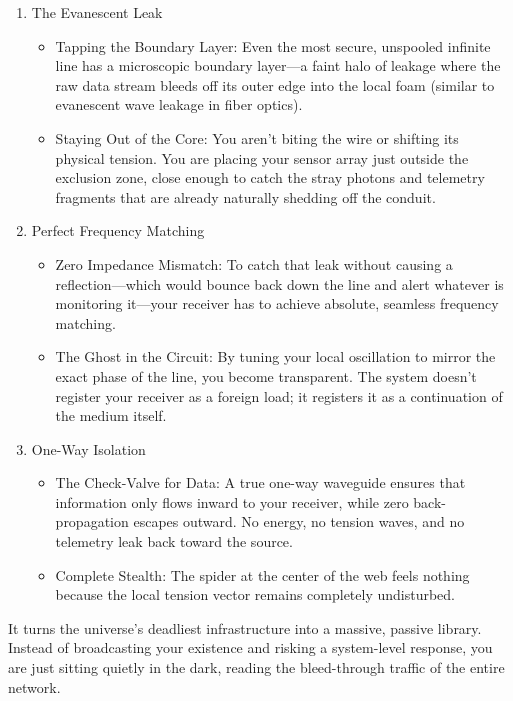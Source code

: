 \begin{enumerate}
\item The Evanescent Leak

\begin{itemize}
\item Tapping the Boundary Layer: Even the most secure, unspooled infinite line has a microscopic boundary layer—a faint halo of leakage where the raw data stream bleeds off its outer edge into the local foam (similar to evanescent wave leakage in fiber optics).
\item Staying Out of the Core: You aren't biting the wire or shifting its physical tension. You are placing your sensor array just outside the exclusion zone, close enough to catch the stray photons and telemetry fragments that are already naturally shedding off the conduit.
\end{itemize}
\item Perfect Frequency Matching

\begin{itemize}
\item Zero Impedance Mismatch: To catch that leak without causing a reflection—which would bounce back down the line and alert whatever is monitoring it—your receiver has to achieve absolute, seamless frequency matching.
\item The Ghost in the Circuit: By tuning your local oscillation to mirror the exact phase of the line, you become transparent. The system doesn't register your receiver as a foreign load; it registers it as a continuation of the medium itself.
\end{itemize}
\item One-Way Isolation

\begin{itemize}
\item The Check-Valve for Data: A true one-way waveguide ensures that information only flows inward to your receiver, while zero back-propagation escapes outward. No energy, no tension waves, and no telemetry leak back toward the source.
\item Complete Stealth: The spider at the center of the web feels nothing because the local tension vector remains completely undisturbed.
\end{itemize}
\end{enumerate}

It turns the universe's deadliest infrastructure into a massive, passive library. Instead of broadcasting your existence and risking a system-level response, you are just sitting quietly in the dark, reading the bleed-through traffic of the entire network.

